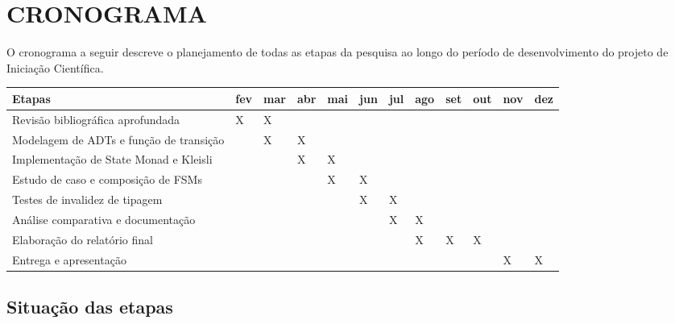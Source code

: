 \documentclass[12pt,a4paper]{article}
\begin{document}
\section{CRONOGRAMA}

O cronograma a seguir descreve o planejamento de todas as etapas da pesquisa ao longo do período de desenvolvimento do projeto de Iniciação Científica.

\begin{table}[h]
\centering
\small
\begin{tabular}{|p{4.0cm}|p{0.6cm}|p{0.6cm}|p{0.6cm}|p{0.6cm}|p{0.6cm}|p{0.6cm}|p{0.6cm}|p{0.6cm}|p{0.6cm}|p{0.6cm}|p{0.6cm}|}
\hline
\textbf{Etapas} & \textbf{fev} & \textbf{mar} & \textbf{abr} & \textbf{mai} & \textbf{jun} & \textbf{jul} & \textbf{ago} & \textbf{set} & \textbf{out} & \textbf{nov} & \textbf{dez} \\
\hline
Revisão bibliográfica aprofundada & X & X & & & & & & & & & \\
\hline
Modelagem de ADTs e função de transição & & X & X & & & & & & & & \\
\hline
Implementação de State Monad e Kleisli & & & X & X & & & & & & & \\
\hline
Estudo de caso e composição de FSMs & & & & X & X & & & & & & \\
\hline
Testes de invalidez de tipagem & & & & & X & X & & & & & \\
\hline
Análise comparativa e documentação & & & & & & X & X & & & & \\
\hline
Elaboração do relatório final & & & & & & & X & X & X & & \\
\hline
Entrega e apresentação & & & & & & & & & & X & X \\
\hline
\end{tabular}
\end{table}


\subsection*{Situação das etapas}
\end{document}
